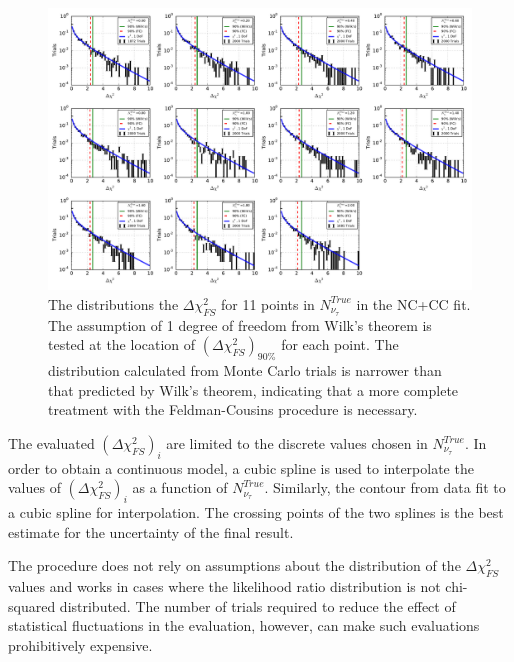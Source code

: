 \begin{landscape}
\begin{figure}
\centering \includegraphics[width=1.2\textwidth]{fc_nc.pdf}
\caption[$\Delta \chi^2_{FS}$ distributions for 11 points in ${N_{\nu_\tau}^{True}}$]{The distributions the $\Delta \chi^2_{FS}$ for 11 points in ${N_{\nu_\tau}^{True}}$ in the NC+CC fit. The assumption of 1 degree of freedom from Wilk's theorem is tested at the location of ${\left(\Delta \chi^2_{FS}\right)_{90\%}}$ for each point. The distribution calculated from Monte Carlo trials is narrower than that predicted by Wilk's theorem, indicating that a more complete treatment with the Feldman-Cousins procedure is necessary.}
\label{fig:llh_ratio_dist}
\end{figure}
\end{landscape}

The evaluated ${\left(\Delta \chi^2_{FS}\right)_i}$ are limited to the discrete values chosen in ${N_{\nu_\tau}^{True}}$.
In order to obtain a continuous model, a cubic spline is used to interpolate the values of ${\left(\Delta \chi^2_{FS}\right)_i}$ as a function of $N_{\nu_\tau}^{True}$.
Similarly, the contour from data fit to a cubic spline for interpolation. 
The crossing points of the two splines is the best estimate for the uncertainty of the final result.

The procedure does not rely on assumptions about the distribution of the $\Delta \chi^2_{FS}$ values and works in cases where the likelihood ratio distribution is not chi-squared distributed.
The number of trials required to reduce the effect of statistical fluctuations in the evaluation, however, can make such evaluations prohibitively expensive.

